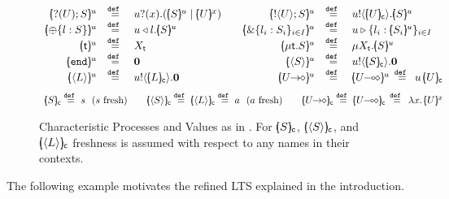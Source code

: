 \documentclass[a4paper,UKenglish]{lipics}
\theoremstyle{definition}
\begin{document}
\begin{figure}[t]
\[
	\begin{array}{rclcrcl}
		\mapchar{\btinp{U} S}{u}
		&\defeq&
		\binp{u}{x} (\mapchar{S}{u} \Par \mapchar{U}{x})
		&&
		\mapchar{\btout{U} S}{u}
		&\defeq&
		\bout{u}{\omapchar{U}} \mapchar{S}{u} %
		\\

		\mapchar{\btsel{l : S}}{u}
		& \defeq &
		\bsel{u}{l} \mapchar{S}{u}
		&&
		\mapchar{\btbra{l_i: S_i}_{i \in I}}{u}
		& \defeq &
		\bbra{u}{l_i: \mapchar{S_i}{u}}_{i \in I}
		\\

		\mapchar{\tvar{t}}{u}
		&\defeq&
		\varp{X}_{\vart{t}}
		& & 
		\mapchar{\trec{t}{S}}{u}
		&\defeq&
		\recp{X_{\vart{t}}}{\mapchar{S}{u}}
		\\

		\mapchar{\tinact}{u}
		& \defeq &
		\inact
		& & 
		\mapchar{\chtype{S}}{u} 
		&\defeq&
		\bout{u}{\omapchar{S}} \inact
		\\

		\mapchar{\chtype{L}}{u}
		&\defeq&
		\bout{u}{\omapchar{L}} \inact
		&&
		\mapchar{\shot{U}}{u}
		&\defeq &
		\mapchar{\lhot{U}}{u}
		\, \defeq \,
		\appl{u}{\omapchar{U}}
		\end{array}
		\]
		\[
		\begin{array}{c}
		\omapchar{S}  \defeq  s ~~ (s \textrm{ fresh})
		\qquad
		\omapchar{\chtype{S}} \defeq \omapchar{\chtype{L}} \defeq a ~~ (a \textrm{ fresh})
		\qquad
		\omapchar{\shot{U}} \defeq \omapchar{\lhot{U}} \,\defeq\, \abs{x}{\mapchar{U}{x}}
	\end{array}
\]
\caption{Characteristic Processes  and Values  as in .
For $[\!\!(S)\!\!]_{\mathsf{c}}$, $[\!\!(\langle S \rangle)\!\!]_{\mathsf{c}}$, and $[\!\!(\langle L \rangle)\!\!]_{\mathsf{c}}$ freshness is assumed with respect to any names in their contexts.
\label{fig:char}}
\end{figure}





The following example motivates the refined 
LTS explained in %
the introduction.
\end{document}
